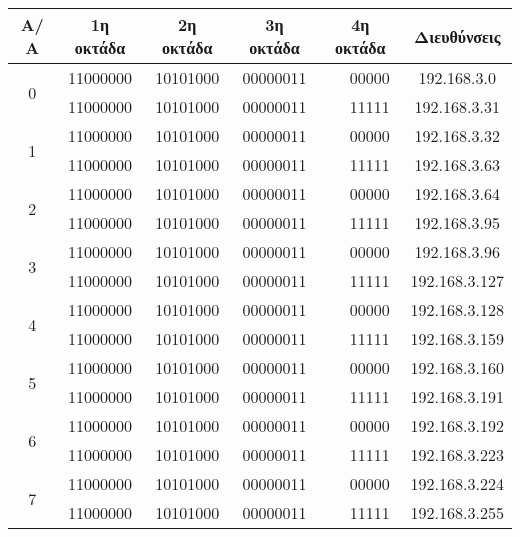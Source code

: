 \begin{center}
\fontsize{10}{12}
\ttfamily
\begin{tabular}{|c|c|c|c|c|c|c|}
\hline
                Α/Α  & 1η οκτάδα  & 2η οκτάδα  & 3η οκτάδα  & \multicolumn{2}{c|}{ 4η οκτάδα }  & Διευθύνσεις \\ \hline

\multirow{2}{*}{0} & 11000000 & 10101000 & 00000011 & \multirow{2}{*}{\colorbox{red}{\color{white}{000}}}  & 00000 & 192.168.3.0 \\ \cline{2-4} \cline{6-7} 
                  & 11000000 & 10101000 & 00000011 &                    & 11111 & 192.168.3.31  \\ \hline

\multirow{2}{*}{1} & 11000000  & 10101000 & 00000011  & \multirow{2}{*}{\colorbox{red}{\color{white}{001}}}  & 00000  & 192.168.3.32 \\ \cline{2-4} \cline{6-7} 
                  & 11000000 & 10101000 & 00000011 &                    & 11111 & 192.168.3.63 \\ \hline
\multirow{2}{*}{2} & 11000000  & 10101000  & 00000011 & \multirow{2}{*}{\colorbox{red}{\color{white}{010}}}  & 00000 & 192.168.3.64 \\ \cline{2-4} \cline{6-7} 
                  & 11000000 & 10101000  & 00000011 &                    & 11111 & 192.168.3.95 \\ \hline
\multirow{2}{*}{3} & 11000000  & 10101000 & 00000011  & \multirow{2}{*}{\colorbox{red}{\color{white}{011}}}  & 00000 & 192.168.3.96 \\ \cline{2-4} 
\cline{6-7} 
                  & 11000000 & 10101000  & 00000011 &                    & 11111 & 192.168.3.127 \\ \hline
\multirow{2}{*}{4} & 11000000 & 10101000  & 00000011 & \multirow{2}{*}{\colorbox{red}{\color{white}{100}}}  & 00000 & 192.168.3.128 \\ \cline{2-4} \cline{6-7} 
                  & 11000000 & 10101000 & 00000011  &                    & 11111 & 192.168.3.159 \\ \hline
\multirow{2}{*}{5} & 11000000  & 10101000  & 00000011 & \multirow{2}{*}{\colorbox{red}{\color{white}{101}}}  & 00000 &  192.168.3.160 \\ \cline{2-4} 
\cline{6-7} 
                  & 11000000 & 10101000 & 00000011 &                    & 11111 &  192.168.3.191 \\ \hline
\multirow{2}{*}{6} & 11000000  & 10101000  & 00000011  & \multirow{2}{*}{\colorbox{red}{\color{white}{110}}}  & 00000 & 192.168.3.192 \\ \cline{2-4} \cline{6-7} 
                  & 11000000 & 10101000  & 00000011 &                    & 11111 & 192.168.3.223 \\ \hline
\multirow{2}{*}{7} & 11000000  & 10101000 & 00000011  & \multirow{2}{*}{\colorbox{red}{\color{white}{111}}}  & 00000  &  192.168.3.224 \\ \cline{2-4} \cline{6-7} 
                  & 11000000 & 10101000  & 00000011 &                    & 11111 & 192.168.3.255 \\ \hline
\end{tabular}
\normalfont
\end{center}

